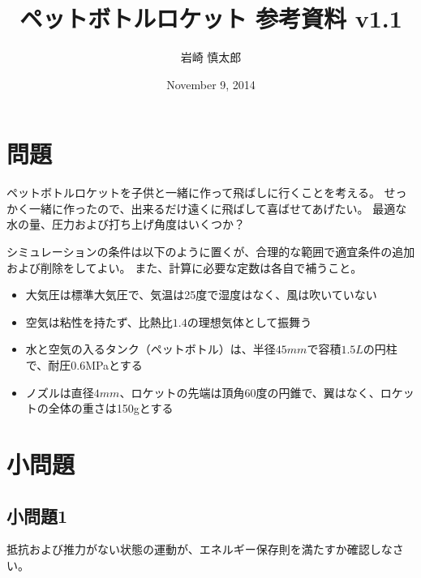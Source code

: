 \documentclass{article}
\title{ ペットボトルロケット 参考資料 v1.1 }
\author{ 岩崎 慎太郎 }
\begin{document}
\date{November 9, 2014}
\maketitle

\section{ 問題 }

ペットボトルロケットを子供と一緒に作って飛ばしに行くことを考える。
せっかく一緒に作ったので、出来るだけ遠くに飛ばして喜ばせてあげたい。
最適な水の量、圧力および打ち上げ角度はいくつか？

シミュレーションの条件は以下のように置くが、合理的な範囲で適宜条件の追加および削除をしてよい。
また、計算に必要な定数は各自で補うこと。

\begin{itemize}
\item 大気圧は標準大気圧で、気温は25度で湿度はなく、風は吹いていない
\item 空気は粘性を持たず、比熱比$1.4$の理想気体として振舞う
\item 水と空気の入るタンク（ペットボトル）は、半径$45mm$で容積$1.5L$の円柱で、耐圧0.6MPaとする
\item ノズルは直径$4mm$、ロケットの先端は頂角60度の円錐で、翼はなく、ロケットの全体の重さは150gとする
\end{itemize}


\section{ 小問題 }

\subsection{ 小問題1 }

抵抗および推力がない状態の運動が、エネルギー保存則を満たすか確認しなさい。
\end{document}

